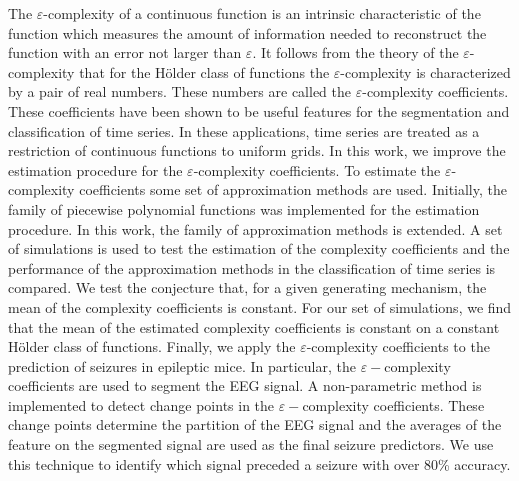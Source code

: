 \documentclass[11pt ]{article}
\begin{document}
The $\varepsilon$-complexity of a continuous function is an intrinsic characteristic of the function which measures the amount of information needed to reconstruct the
function with an error not larger than $\varepsilon$. It follows from the theory of the $\varepsilon$-complexity that for the H\"older class of functions the $\varepsilon$-complexity is characterized by a pair of real numbers. These numbers are called the $\varepsilon$-complexity coefficients.
These coefficients have been shown to be useful features for the segmentation and classification of time series. In these applications, time series are treated as a restriction of continuous functions to uniform grids. In this work, we improve the estimation procedure for the $\varepsilon$-complexity coefficients. To estimate the $\varepsilon$-complexity coefficients some set of approximation methods are used. Initially, the family of piecewise polynomial functions was implemented for the estimation procedure. In this work, the family of approximation methods is extended. A set of simulations is used to test the estimation of the complexity coefficients and the performance of the approximation methods in the classification of time series is compared.
We test the conjecture that, for a given generating mechanism, the mean of the complexity coefficients is constant.
For our set of simulations, we find that the mean of the estimated complexity coefficients is constant on a constant H\"{o}lder class of functions. Finally, we apply the $\varepsilon$-complexity coefficients to the prediction of seizures in epileptic mice. In particular, the $\varepsilon-$complexity coefficients are used to segment the EEG signal.   
 A non-parametric method is implemented to detect change points in the $\varepsilon-$complexity coefficients. These change points 
 determine the partition of the EEG signal and the averages of the feature on the segmented signal are used as the final seizure predictors. We use this technique to identify which signal preceded a seizure with over 80\% accuracy. 
\end{document}
